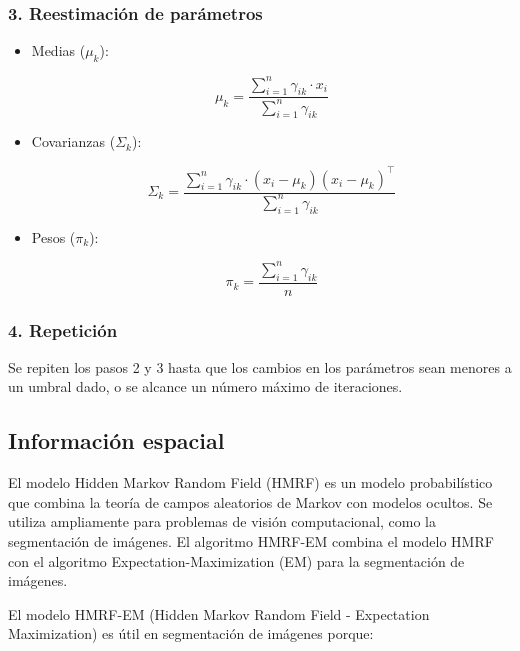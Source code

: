 \subsubsection{3. Reestimación de parámetros}

\begin{itemize}
\setlength{\itemsep}{-1ex}
    \item{\begin{flushleft} Medias ($\mu_k$):  \end{flushleft}}

    $$\mu_k =\frac{\sum_{i=1}^n \gamma_{ik} \cdot x_i }{\sum_{i=1}^n \gamma_{ik} }$$

    \item{\begin{flushleft} Covarianzas ($\Sigma_k$): \end{flushleft}}

    $$\Sigma_k =\frac{\sum_{i=1}^n \gamma_{ik} \cdot (x_i -\mu_k )(x_i -\mu_k )^{\top } }{\sum_{i=1}^n \gamma_{ik} }$$

    \item{\begin{flushleft} Pesos ($\pi_k$): \end{flushleft}}
    
    $$\pi_k =\frac{\sum_{i=1}^n \gamma_{ik} }{n}$$
\end{itemize}

\subsubsection{4. Repetición}

Se repiten los pasos 2 y 3 hasta que los cambios en los parámetros sean menores a un umbral dado, o se alcance un número máximo de iteraciones.

\subsection{Información espacial}\label{informacion-espacial}

El modelo Hidden Markov Random Field (HMRF) \cite{wang2012hmrf} es un modelo probabilístico que combina la teoría de campos aleatorios de Markov con modelos ocultos. Se utiliza ampliamente para problemas de visión computacional, como la segmentación de imágenes. El algoritmo HMRF-EM combina el modelo HMRF con el algoritmo Expectation-Maximization (EM) para la segmentación de imágenes.

El modelo HMRF-EM (Hidden Markov Random Field - Expectation Maximization) es útil en segmentación de imágenes porque:

